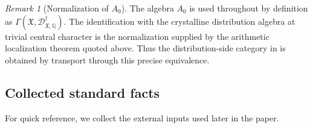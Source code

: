 \documentclass[11pt]{amsart}
\theoremstyle{plain}
\theoremstyle{definition}
\theoremstyle{remark}
\newtheorem{remark}{Remark}[section]
\begin{document}
\begin{remark}[Normalization of \(A_0\)]
\label{rem:A0-normalization}
The algebra \(A_0\) is used throughout by definition as
\(\Gamma(\mathfrak X,\mathscr D^\dagger_{\mathfrak X,\mathbb Q})\).  The
identification with the crystalline distribution algebra at trivial central
character is the normalization supplied by the arithmetic localization theorem
quoted above.  Thus the distribution-side category in 
is obtained by transport through this precise equivalence.
\end{remark}

\subsection{Collected standard facts}

For quick reference, we collect the external inputs used later in the paper.
\end{document}
